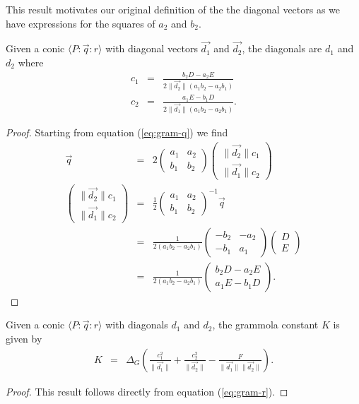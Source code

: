 This result motivates our original definition of the the diagonal vectors as we have expressions for the squares of $a_2$ and $b_2$.

\begin{theorem}\label{th:gram-diags}
Given a conic $\langle P\!:\!\vec{q}\!:\!r \rangle$ with diagonal vectors $\vec{d_1}$ and $\vec{d_2}$, the diagonals are $d_1$ and $d_2$ where
\begin{eqnarray}
c_1 & = & \frac{b_2D - a_2E}{2\|\vec{d_2}\|(a_1b_2 - a_2b_1)}\\
c_2 & = & \frac{a_1E - b_1D}{2\|\vec{d_1}\|(a_1b_2 - a_2b_1)}.
\end{eqnarray}
\end{theorem}
\begin{proof}Starting from equation (\ref{eq:gram-q}) we find
\begin{eqnarray*}
\vec{q} & = & 2\begin{pmatrix} a_1 & a_2 \\ b_1 & b_2 \end{pmatrix}\begin{pmatrix} \|\vec{d_2}\|c_1 \\ \|\vec{d_1}\|c_2  \end{pmatrix}\\
\begin{pmatrix} \|\vec{d_2}\|c_1 \\ \|\vec{d_1}\|c_2  \end{pmatrix} & = & \frac{1}{2}\begin{pmatrix} a_1 & a_2 \\ b_1 & b_2 \end{pmatrix}^{-1}\vec{q}\\
 & = & \frac{1}{2(a_1b_2 - a_2b_1)}\begin{pmatrix} -b_2 & -a_2 \\ -b_1 & a_1 \end{pmatrix} \begin{pmatrix} D \\ E\end{pmatrix}\\
 & = & \frac{1}{2(a_1b_2 - a_2b_1)}\begin{pmatrix} b_2D - a_2E \\ a_1E - b_1D\end{pmatrix}.
\end{eqnarray*}
\end{proof}

\begin{theorem}\label{th:gram-const}
Given a conic $\langle P\!:\!\vec{q}\!:\!r \rangle$ with diagonals $d_1$ and $d_2$, the grammola constant $K$ is given by
\begin{eqnarray}
K & = & \Delta_G\left(\frac{c_1^2}{\|\vec{d_1}\|} + \frac{c_2^2}{\|\vec{d_2}\|} - \frac{F}{\|\vec{d_1}\|\|\vec{d_2}\|}\right).
\end{eqnarray}
\end{theorem}
\begin{proof}
This result follows directly from equation (\ref{eq:gram-r}).
\end{proof}

